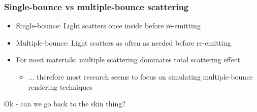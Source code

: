 \documentclass{f4_beamer_metropolis}
\begin{document}
\begin{frame}[t]
  \frametitle{Single-bounce vs multiple-bounce scattering}
    \begin{itemize}
      \item Single-bounce: Light scatters once inside before re-emitting
      \item Multiple-bounce: Light scatters as often as needed before re-emitting
      \item For most materials: multiple scattering dominates total scattering effect
      \begin{itemize}
        \item ... therefore most research seems to focus on simulating multiple-bounce rendering techniques
      \end{itemize}
    \end{itemize}

\end{frame}

\begin{frame}[standout]
  Ok - can we go back to the skin thing?
\end{frame}
\end{document}
